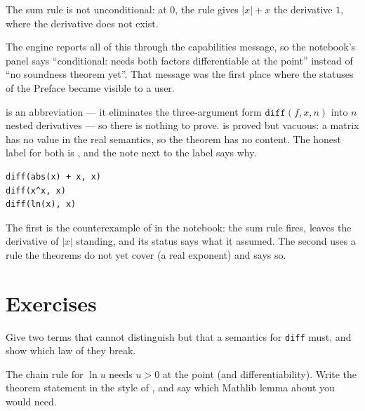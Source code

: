 \begin{thmbox}
  The sum rule is not unconditional: at $0$, the rule gives $|x| + x$ the derivative $1$, where
  the derivative does not exist.
\end{thmbox}

The engine reports all of this through the capabilities message, so the notebook's panel says
``conditional: needs both factors differentiable at the point'' instead of ``no soundness
theorem yet''. That message was the first place where the statuses of the Preface became
visible to a user.

\begin{logbox}
   is an abbreviation --- it eliminates the three-argument form
  $\texttt{diff}(f, x, n)$ into $n$ nested derivatives --- so there is nothing to prove.
   is proved but vacuous: a matrix has no value in the real semantics, so the
  theorem has no content. The honest label for both is , and the note next to
  the label says why.
\end{logbox}

\begin{trybox}
\begin{verbatim}
diff(abs(x) + x, x)
diff(x^x, x)
diff(ln(x), x)
\end{verbatim}
  The first is the counterexample of  in the notebook: the sum rule
  fires, leaves the derivative of $|x|$ standing, and its status says what it assumed. The second uses a rule the theorems do not yet cover
  (a real exponent) and says so.
\end{trybox}

\section{Exercises}

\begin{exercisebox}
  Give two terms that  cannot distinguish but that a semantics for \texttt{diff} must,
  and show which law of  they break.
\end{exercisebox}

\begin{exercisebox}
  The chain rule for $\ln u$ needs $u > 0$ at the point (and differentiability). Write the
  theorem statement in the style of , and say which Mathlib lemma
  about  you would need.
\end{exercisebox}
